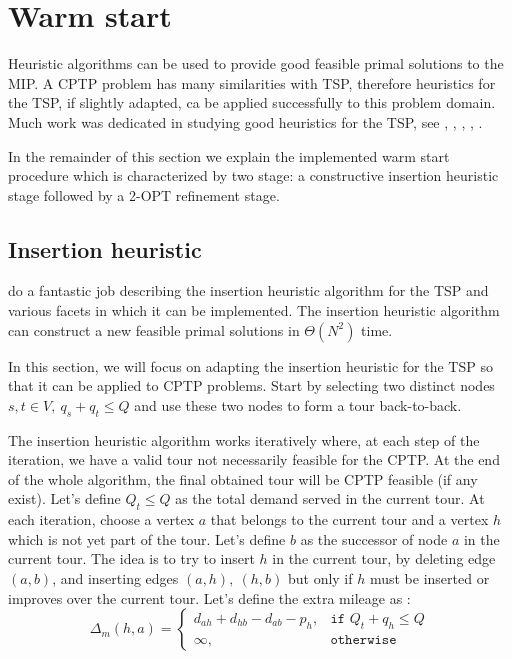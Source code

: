 \section{Warm start}

Heuristic algorithms can be used to provide good feasible primal solutions to the MIP.
A CPTP problem has many similarities with TSP, therefore heuristics for the TSP, if slightly adapted, ca be applied successfully to this problem domain.
Much work was dedicated in studying good heuristics for the TSP, see \cite{rosenkrantz_analysis_1977}, \cite{johnson_traveling_1997}, \cite{laporte_traveling_1992}, \cite{johnson_experimental_2007}, \cite{hoffman_traveling_2013}.

In the remainder of this section we explain the implemented warm start procedure which is characterized by two stage: a constructive insertion heuristic stage followed by a 2-OPT refinement stage.

\subsection{Insertion heuristic}
\cite{rosenkrantz_analysis_1977} do a fantastic job describing the insertion heuristic algorithm for the TSP and various facets in which it can be implemented.
The insertion heuristic algorithm can construct a new feasible primal solutions in $\Theta(N^2)$ time.

In this section, we will focus on adapting the insertion heuristic for the TSP so that it can be applied to CPTP problems.
Start by selecting two distinct nodes $s, t \in V,\ q_s + q_t \le Q$ and use these two nodes to form a tour back-to-back.

The insertion heuristic algorithm works iteratively where, at each step of the iteration, we have a valid tour not necessarily feasible for the CPTP.
At the end of the whole algorithm, the final obtained tour will be CPTP feasible (if any exist).
Let's define $Q_t \le Q$ as the total demand served in the current tour.
At each iteration, choose a vertex $a$ that belongs to the current tour and a vertex $h$ which is not yet part of the tour.
Let's define $b$ as the successor of node $a$ in the current tour.
The idea is to try to insert $h$ in the current tour, by deleting edge $(a, b)$, and inserting edges $(a, h),\ (h, b)$ but only if $h$ must be inserted or improves over the current tour.
Let's define the extra mileage as
:
\begin{equation}
	\Delta_m(h, a) =
	\begin{cases}
		d_{ah} + d_{hb} - d_{ab} - p_h, & \texttt{if } Q_t + q_h \le Q \\
		\infty,                         & \texttt{otherwise}
	\end{cases}
\end{equation}

